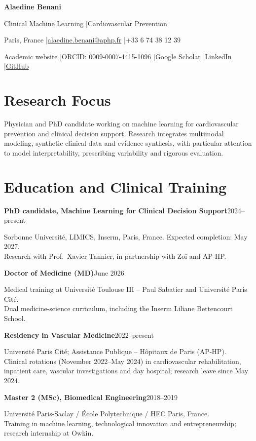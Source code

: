 \documentclass[10pt,letterpaper]{article}
\newcommand{\entry}[2]{\par\vspace{5pt}\noindent\textbf{#1}\hfill{\sffamily\small\color{muted}#2}\par\vspace{1pt}}
\begin{document}
\fontsize{10.5}{13.2}\selectfont
\thispagestyle{first}

{\fontsize{24}{28}\selectfont\bfseries Alaedine Benani}\hspace{8pt}{\large MD, MSc}\par
\vspace{3pt}
{\sffamily\color{accent}Clinical Machine Learning \enspace|\enspace Cardiovascular Prevention}\par
\vspace{2pt}
Paris, France \enspace|\enspace \href{mailto:alaedine.benani@aphp.fr}{alaedine.benani@aphp.fr} \enspace|\enspace +33 6 74 38 12 39\par
\vspace{2pt}
{\small\href{https://alaedinebe.github.io/benani/}{Academic website} \enspace|\enspace \href{https://orcid.org/0009-0007-4415-1096}{ORCID: 0009-0007-4415-1096} \enspace|\enspace \href{https://scholar.google.com/citations?user=om31gMwAAAAJ}{Google Scholar} \enspace|\enspace \href{https://www.linkedin.com/in/alaedine}{LinkedIn} \enspace|\enspace \href{https://github.com/alaedinebe}{GitHub}}\par

\section{Research Focus}
Physician and PhD candidate working on machine learning for cardiovascular prevention and clinical decision support. Research integrates multimodal modeling, synthetic clinical data and evidence synthesis, with particular attention to model interpretability, prescribing variability and rigorous evaluation.

\section{Education and Clinical Training}
\entry{PhD candidate, Machine Learning for Clinical Decision Support}{2024--present}
Sorbonne Université, LIMICS, Inserm, Paris, France. Expected completion: May 2027.\\
Research with Prof.\ Xavier Tannier, in partnership with Zoī and AP-HP.
\entry{Doctor of Medicine (MD)}{June 2026}
Medical training at Université Toulouse III -- Paul Sabatier and Université Paris Cité.\\
Dual medicine-science curriculum, including the Inserm Liliane Bettencourt School.
\entry{Residency in Vascular Medicine}{2022--present}
Université Paris Cité; Assistance Publique -- Hôpitaux de Paris (AP-HP).\\
Clinical rotations (November 2022--May 2024) in cardiovascular rehabilitation, inpatient care, vascular investigations and day hospital; research leave since May 2024.
\entry{Master 2 (MSc), Biomedical Engineering}{2018--2019}
Université Paris-Saclay / École Polytechnique / HEC Paris, France.\\
Training in machine learning, technological innovation and entrepreneurship; research internship at Owkin.
\end{document}
